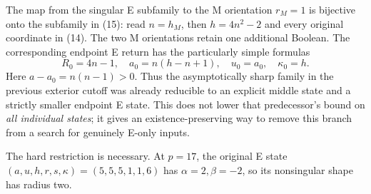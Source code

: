 The map from the singular E subfamily to the M orientation $r_M=1$ is bijective
onto the subfamily in (15): read $n=h_M$, then $h=4n^2-2$ and every original
coordinate in (14). The two M orientations retain one additional Boolean.
The corresponding endpoint E return has the particularly simple formulas
\[
 R_0=4n-1,\quad a_0=n(h-n+1),\quad u_0=a_0,\quad\kappa_0=h.
\]
Here $a-a_0=n(n-1)>0$. Thus the asymptotically sharp family in the previous
exterior cutoff was already reducible to an explicit middle state and a strictly
smaller endpoint E state. This does not lower that predecessor's bound on
\emph{all individual states}; it gives an existence-preserving way to remove
this branch from a search for genuinely E-only inputs.

The hard restriction is necessary. At $p=17$, the original E state
$(a,u,h,r,s,\kappa)=(5,5,5,1,1,6)$ has $\alpha=2,\beta=-2$, so its nonsingular
shape has radius two.

